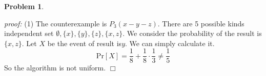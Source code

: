 \documentclass{article}
\newtheorem{problem}[theorem]{Problem}
\newenvironment{solution}{\noindent \textit{proof:}}{$\Box$}
\begin{document}
\begin{problem}
\end{problem}
\begin{solution}
    (1) The counterexample is $P_3(x-y-z)$. There are 5 possible kinds independent set $\emptyset, \{x\}, \{y\}, \{z\}, \{x,z\}$. We consider the probability of the result is $\{x,z\}$. Let $X$ be the event of result is$y$. We can simply calculate it.
    $$
    \mathrm{Pr}[X] = \frac 1 8 + \frac 1 8 \cdot \frac 1 3 \not= \frac 1 5
    $$
    So the algorithm is not uniform.
\end{solution}
\end{document}

